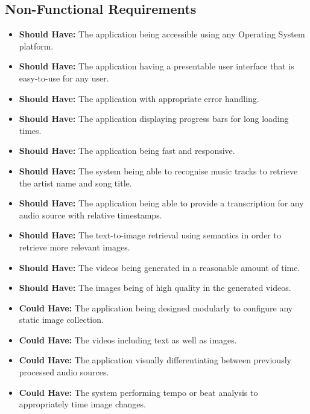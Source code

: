 \documentclass{l4proj}
\begin{document}
\subsection{Non-Functional Requirements}
\begin{itemize}
    \item \textbf{Should Have:} The application being accessible using any Operating System platform.
    \item \textbf{Should Have:} The application having a presentable user interface that is easy-to-use for any user.
    \item \textbf{Should Have:} The application with appropriate error handling.
    \item \textbf{Should Have:} The application displaying progress bars for long loading times.
    \item \textbf{Should Have:} The application being fast and responsive.
    \item \textbf{Should Have:} The system being able to recognise music tracks to retrieve the artist name and song title.
    \item \textbf{Should Have:} The application being able to provide a transcription for any audio source with relative timestamps.
    \item \textbf{Should Have:} The text-to-image retrieval using semantics in order to retrieve more relevant images.
    \item \textbf{Should Have:} The videos being generated in a reasonable amount of time.
    \item \textbf{Should Have:} The images being of high quality in the generated videos.
    \item \textbf{Could Have:} The application being designed modularly to configure any static image collection.
    \item \textbf{Could Have:} The videos including text as well as images.
    \item \textbf{Could Have:} The application visually differentiating between previously processed audio sources.
    \item \textbf{Could Have:} The system performing tempo or beat analysis to appropriately time image changes.
\end{itemize}

\end{document}
